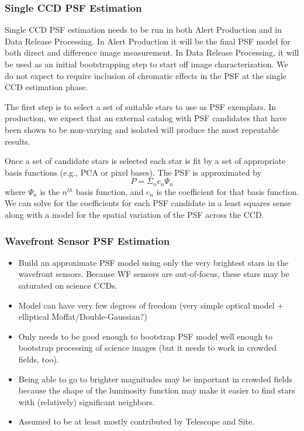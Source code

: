 \subsubsection{Single CCD PSF Estimation}
\label{sec:acSingleCCDPSF}

Single CCD PSF estimation needs to be run in both Alert Production and in Data Release Processing.  In Alert Production it will be the final PSF model for both direct and difference image measurement.  In Data Release Processing, it will be used as an initial bootstrapping step to start off image characterization.  We do not expect to require inclusion of chromatic effects in the PSF at the single CCD estimation phase.

The first step is to select a set of suitable stars to use as PSF exemplars.  In production, we expect that an external catalog with PSF candidates that have been shown to be non-varying and isolated will produce the most repeatable results.

Once a set of candidate stars is selected each star is fit by a set of
appropriate basis functions (e.g., PCA or pixel bases).  The PSF is approximated by
\[
P = \Sigma_n c_n\Psi_n
\]
where $\Psi_n$ is the $n^{th}$ basis function, and $c_n$ is the coefficient for that basis function.  We can solve for the coefficients for each PSF candidate in a least squares sense along with a model for the spatial variation of the PSF
across the CCD.

\subsubsection{Wavefront Sensor PSF Estimation}
\label{sec:acWavefrontSensorPSF}
\begin{itemize}
\item Build an approximate PSF model using only the very brightest stars in the wavefront sensors.  Because WF sensors are out-of-focus, these stars may be saturated on science CCDs.
\item Model can have very few degrees of freedom (very simple optical model + elliptical Moffat/Double-Gaussian?)
\item Only needs to be good enough to bootstrap PSF model well enough to bootstrap processing of science images (but it needs to work in crowded fields, too).
\item Being able to go to brighter magnitudes may be important in crowded fields because the shape of the luminosity function may make it easier to find stars with (relatively) significant neighbors.
\item Assumed to be at least mostly contributed by Telescope and Site.
\end{itemize}

